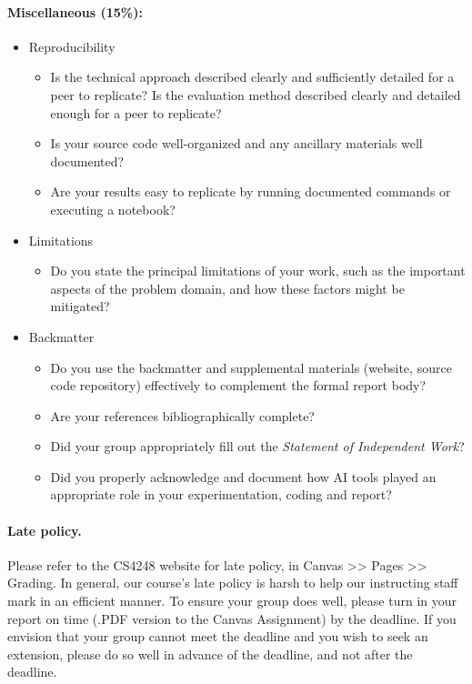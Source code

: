 \documentclass[11pt]{article}
\begin{document}
\paragraph{Miscellaneous (15\%):}

\begin{itemize}
    \item Reproducibility
    \begin{itemize}
        \item Is the technical approach described clearly and sufficiently detailed for a peer to replicate?  Is the evaluation method described clearly and detailed enough for a peer to replicate? 
        \item Is your source code well-organized and any ancillary materials well documented?
        \item Are your results easy to replicate by running documented commands or executing a notebook?
    \end{itemize}
    \item Limitations
    \begin{itemize}
        \item Do you state the principal limitations of your work, such as the important aspects of the problem domain, and how these factors might be mitigated?
    \end{itemize}
    \item Backmatter
    \begin{itemize}
        \item Do you use the backmatter and supplemental materials (website, source code repository) effectively to complement the formal report body?
        \item Are your references bibliographically complete?     
        \item Did your group appropriately fill out the {\it Statement of Independent Work}? 
        \item Did you properly acknowledge and document how AI tools played an appropriate role in your experimentation, coding and report?
    \end{itemize}
    
\end{itemize}

\paragraph{Late policy.} Please refer to the CS4248 website for late policy, in Canvas >> Pages >> Grading.  In general, our course's late policy is harsh to help our instructing staff mark in an efficient manner.  To ensure your group does well, please turn in your report on time (.PDF version to the Canvas Assignment) by the deadline.  If you envision that your group cannot meet the deadline and you wish to seek an extension, please do so well in advance of the deadline, and not after the deadline.
\end{document}

